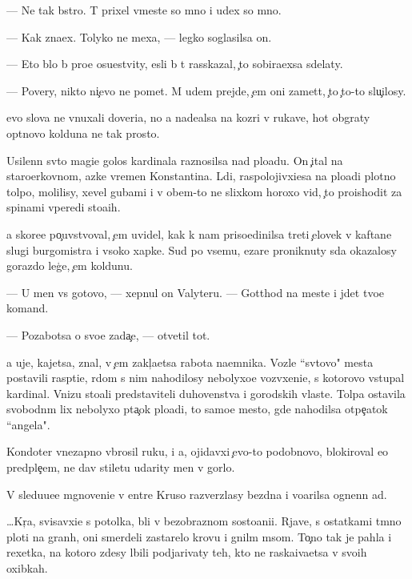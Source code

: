 \documentclass[10pt]{book}
\begin{document}
— Ne tak b{\yi}stro. T{\yi} prixel vmeste so mno{\y} i u{\y}dex so mno{\y}.

— Kak zna{\y}ex. Tolyko ne mexa{\y}, — legko soglasilsa on.

— Eto b{\yi}lo b{\yi} pro{\x}e osu{\x}estvity, {\y}esli b{\yi} t{\yi} rasskazal, {\c}to sobira{\y}exsa sdelaty.

— Povery, nikto ni{\c}evo ne po{\y}met. M{\yi} u{\y}dem prejde, {\c}em oni zamet{\ia}t, {\c}to {\c}to-to slu{\c}ilosy.

{\Y}evo slova ne vnuxali doveri{\y}a, no {\y}a nade{\y}alsa na koz{\yi}ri v rukave, hot{\ia} ob{\yi}graty op{\yi}tnovo kolduna ne tak prosto.

Usilenn{\yi}{\y} sv{\ia}to{\y} magi{\y}e{\y} golos kardinala raznosilsa nad plo{\x}ad{\y}u. On {\c}ital na staro{\q}erkovnom, {\y}az{\yi}ke vremen Konstantina. L{\iu}di, raspolojivxi{\y}esa na plo{\x}adi plotno{\y} tolpo{\y}, molilisy, xevel{\ia} gubami i v ob{\x}em-to ne slixkom horoxo vid{\ia}, {\c}to proishodit za spinami vperedi sto{\y}a{\x}ih.

{\Y}a skore{\y}e po{\c}uvstvoval, {\c}em uvidel, kak k nam priso{\y}edinilsa treti{\y} {\c}elovek v kaftane slugi burgomistra i v{\yi}soko{\y} xapke. Sud{\ia} po vsemu, {\C}ezare proniknuty s{\iu}da okazalosy gorazdo leg{\c}e, {\c}em koldunu.

— U men{\ia} vs{\e} gotovo, — xepnul on Valyteru. — Gotthod na meste i jdet tvo{\y}e{\y} komand{\yi}.

— Pozabotsa o svo{\y}e{\y} zada{\c}e, — otvetil tot.

{\Y}a uje, kajetsa, znal, v {\c}em zakl{\iu}{\c}a{\y}etsa rabota na{\y}emnika. Vozle ``sv{\ia}tovo" mesta postavili rasp{\ia}ti{\y}e, r{\ia}dom s nim nahodilosy nebolyxo{\y}e vozv{\yi}xeni{\y}e, s kotorovo v{\yi}stupal kardinal. Vnizu sto{\y}ali predstaviteli duhovenstva i gorodskih vlaste{\y}. Tolpa ostavila svobodn{\yi}m lix nebolyxo{\y} p{\ia}ta{\c}ok plo{\x}adi, to samo{\y}e mesto, gde nahodilsa otpe{\c}atok ``angela".

Kondot{\y}er vnezapno v{\yi}brosil ruku, i {\y}a, ojidavxi{\y} {\c}evo-to podobnovo, blokiroval {\y}e{\y}o predple{\c}{\y}em, ne dav stiletu udarity men{\ia} v gorlo.

V sledu{\y}u{\x}e{\y}e mgnoveni{\y}e v {\q}entre Kruso razverzlasy bezdna i vo{\q}arilsa ognenn{\yi}{\y} ad.



…Kr{\iu}{\c}{\y}a, svisavxi{\y}e s potolka, b{\yi}li v bezobraznom sosto{\y}ani{\y}i. Rjav{\yi}{\y}e, s ostatkami t{\e}mno{\y} ploti na gran{\ia}h, oni smerdeli zastarelo{\y} krov{\y}u i gnil{\yi}m m{\ia}som. To{\c}no tak je pahla i rexetka, na kotoro{\y} zdesy l{\iu}bili podjarivaty teh, kto ne raska{\y}iva{\y}etsa v svo{\y}ih oxibkah.
\end{document}
